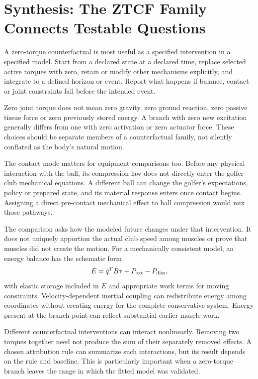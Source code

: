 \section{Synthesis: The ZTCF Family Connects Testable Questions}

A zero-torque counterfactual is most useful as a specified intervention in a specified model. Start from a declared state at a declared time, replace selected active torques with zero, retain or modify other mechanisms explicitly, and integrate to a defined horizon or event. Report what happens if balance, contact or joint constraints fail before the intended event.

Zero joint torque does not mean zero gravity, zero ground reaction, zero passive tissue force or zero previously stored energy. A branch with zero new excitation generally differs from one with zero activation or zero actuator force. These choices should be separate members of a counterfactual family, not silently conflated as the body's natural motion.

The contact mode matters for equipment comparisons too. Before any physical interaction with the ball, its compression law does not directly enter the golfer--club mechanical equations. A different ball can change the golfer's expectations, policy or prepared state, and its material response enters once contact begins. Assigning a direct pre-contact mechanical effect to ball compression would mix those pathways.

The comparison asks how the modeled future changes under that intervention. It does not uniquely apportion the actual club speed among muscles or prove that muscles did not create the motion. For a mechanically consistent model, an energy balance has the schematic form
\[
\dot E=\dot q^T B\tau+P_{\rm ext}-P_{\rm diss},
\]
with elastic storage included in $E$ and appropriate work terms for moving constraints. Velocity-dependent inertial coupling can redistribute energy among coordinates without creating energy for the complete conservative system. Energy present at the branch point can reflect substantial earlier muscle work.

Different counterfactual interventions can interact nonlinearly. Removing two torques together need not produce the sum of their separately removed effects. A chosen attribution rule can summarize such interactions, but its result depends on the rule and baseline. This is particularly important when a zero-torque branch leaves the range in which the fitted model was validated.

